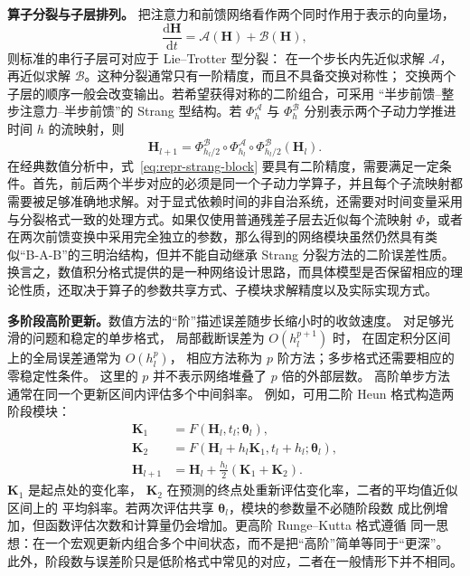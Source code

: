 \documentclass[UTF8,a4paper,zihao=-4,oneside,openany]{ctexbook}
\begin{document}
\textbf{算子分裂与子层排列。}
把注意力和前馈网络看作两个同时作用于表示的向量场，
\[
    \frac{\mathrm{d}\boldsymbol{H}}{\mathrm{d}t}
    =
    \mathcal{A}(\boldsymbol{H})
    +
    \mathcal{B}(\boldsymbol{H}),
\]
则标准的串行子层可对应于 Lie--Trotter 型分裂：
在一个步长内先近似求解 \(\mathcal{A}\)，再近似求解
\(\mathcal{B}\)。这种分裂通常只有一阶精度，而且不具备交换对称性；
交换两个子层的顺序一般会改变输出。若希望获得对称的二阶组合，可采用
“半步前馈--整步注意力--半步前馈”的 Strang 型结构。若
\(\Phi_h^{\mathcal{A}}\) 与 \(\Phi_h^{\mathcal{B}}\)
分别表示两个子动力学推进时间 \(h\) 的流映射，则
\begin{equation}
    \boldsymbol{H}_{l+1}
    =
    \Phi_{h_l/2}^{\mathcal{B}}
    \circ
    \Phi_{h_l}^{\mathcal{A}}
    \circ
    \Phi_{h_l/2}^{\mathcal{B}}
    (\boldsymbol{H}_l).
    \label{eq:repr-strang-block}
\end{equation}
在经典数值分析中，式~\eqref{eq:repr-strang-block} 要具有二阶精度，需要满足一定条件。首先，前后两个半步对应的必须是同一个子动力学算子，并且每个子流映射都需要被足够准确地求解。对于显式依赖时间的非自治系统，还需要对时间变量采用与分裂格式一致的处理方式。如果仅使用普通残差子层去近似每个流映射 \(\Phi\)，或者在两次前馈变换中采用完全独立的参数，那么得到的网络模块虽然仍然具有类似“B-A-B”的三明治结构，但并不能自动继承 Strang 分裂方法的二阶误差性质。换言之，数值积分格式提供的是一种网络设计思路，而具体模型是否保留相应的理论性质，还取决于算子的参数共享方式、子模块求解精度以及实际实现方式。

\textbf{多阶段高阶更新。}数值方法的“阶”描述误差随步长缩小时的收敛速度。
对足够光滑的问题和稳定的单步格式，
局部截断误差为 \(O(h_l^{p+1})\) 时，
在固定积分区间上的全局误差通常为 \(O(h_l^p)\)，
相应方法称为 \(p\) 阶方法；多步格式还需要相应的零稳定性条件。
这里的 \(p\) 并不表示网络堆叠了 \(p\) 倍的外部层数。
高阶单步方法通常在同一个更新区间内评估多个中间斜率。
例如，可用二阶 Heun 格式构造两阶段模块：
\begin{align}
    \boldsymbol{K}_1
    &=
    F\!\left(
        \boldsymbol{H}_{l},t_l;
        \boldsymbol{\theta}_{l}
    \right),
    \nonumber\\
    \boldsymbol{K}_2
    &=
    F\!\left(
        \boldsymbol{H}_{l}+h_l\boldsymbol{K}_1,
        t_l+h_l;
        \boldsymbol{\theta}_{l}
    \right),
    \nonumber\\
    \boldsymbol{H}_{l+1}
    &=
    \boldsymbol{H}_{l}
    +
    \frac{h_l}{2}
    \left(
        \boldsymbol{K}_1+\boldsymbol{K}_2
    \right).
    \label{eq:repr-rk2-block}
\end{align}
\(\boldsymbol{K}_1\) 是起点处的变化率，
\(\boldsymbol{K}_2\) 在预测的终点处重新评估变化率，二者的平均值近似区间上的
平均斜率。若两次评估共享 \(\boldsymbol{\theta}_l\)，模块的参数量不必随阶段数
成比例增加，但函数评估次数和计算量仍会增加。更高阶 Runge--Kutta 格式遵循
同一思想：在一个宏观更新内组合多个中间状态，而不是把“高阶”简单等同于“更深”。
此外，阶段数与误差阶只是低阶格式中常见的对应，二者在一般情形下并不相同。
\end{document}
